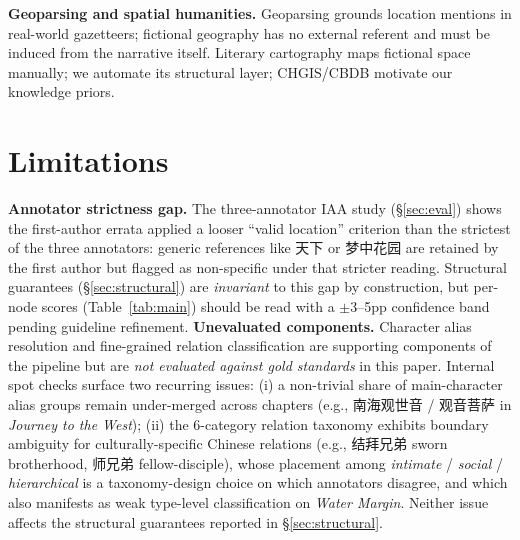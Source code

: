\documentclass[11pt]{article}
\newenvironment{CJK}[2]{}{}
\begin{document}
\textbf{Geoparsing and spatial humanities.} Geoparsing \cite{gritta2018geoparsing} grounds location mentions in real-world gazetteers; fictional geography has no external referent and must be induced from the narrative itself. Literary cartography \cite{moretti1998atlas,piatti2011cartographies,bodenhamer2010spatial} maps fictional space manually; we automate its structural layer; CHGIS/CBDB \cite{chgis,cbdb} motivate our knowledge priors.
\section*{Limitations}

\textbf{Annotator strictness gap.} The three-annotator IAA study (\S\ref{sec:eval}) shows the first-author errata applied a looser ``valid location'' criterion than the strictest of the three annotators: generic references like \begin{CJK}{UTF8}{gbsn}天下\end{CJK} or \begin{CJK}{UTF8}{gbsn}梦中花园\end{CJK} are retained by the first author but flagged as non-specific under that stricter reading. Structural guarantees (\S\ref{sec:structural}) are \emph{invariant} to this gap by construction, but per-node scores (Table~\ref{tab:main}) should be read with a $\pm$3--5pp confidence band pending guideline refinement.
\textbf{Unevaluated components.} Character alias resolution and fine-grained relation classification are supporting components of the pipeline but are \emph{not evaluated against gold standards} in this paper. Internal spot checks surface two recurring issues: (i) a non-trivial share of main-character alias groups remain under-merged across chapters (e.g., \begin{CJK}{UTF8}{gbsn}南海观世音\end{CJK} / \begin{CJK}{UTF8}{gbsn}观音菩萨\end{CJK} in \textit{Journey to the West}); (ii) the 6-category relation taxonomy exhibits boundary ambiguity for culturally-specific Chinese relations (e.g., \begin{CJK}{UTF8}{gbsn}结拜兄弟\end{CJK} sworn brotherhood, \begin{CJK}{UTF8}{gbsn}师兄弟\end{CJK} fellow-disciple), whose placement among \emph{intimate} / \emph{social} / \emph{hierarchical} is a taxonomy-design choice on which annotators disagree, and which also manifests as weak type-level classification on \textit{Water Margin}. Neither issue affects the structural guarantees reported in \S\ref{sec:structural}.
\end{document}

